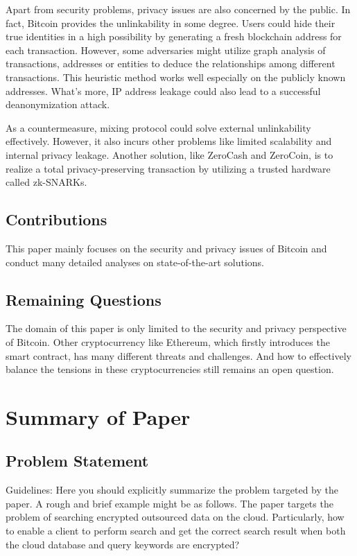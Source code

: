 \documentclass[conference]{IEEEtran}
\begin{document}
Apart from security problems, privacy issues are also concerned by the public.
%
In fact, Bitcoin provides the unlinkability in some degree.
%
Users could hide their true identities in a high possibility by generating a fresh blockchain address for each transaction.
%
However, some adversaries might utilize graph analysis of transactions, addresses or entities to deduce the relationships among different transactions.
%
This heuristic method works well especially on the publicly known addresses.
%
What's more, IP address leakage could also lead to a successful deanonymization attack.

As a countermeasure, mixing protocol could solve external unlinkability effectively.
%
However, it also incurs other problems like limited scalability and internal privacy leakage.
%
Another solution, like ZeroCash and ZeroCoin, is to realize a total privacy-preserving transaction by utilizing a trusted hardware called zk-SNARKs. 

\subsection{Contributions}
This paper mainly focuses on the security and privacy issues of Bitcoin and conduct many detailed analyses on state-of-the-art solutions.

\subsection{Remaining Questions}
The domain of this paper is only limited to the security and privacy perspective of Bitcoin.
%
Other cryptocurrency like Ethereum, which firstly introduces the smart contract, has many different threats and challenges.
%
And how to effectively balance the tensions in these cryptocurrencies still remains an open question.


\section{Summary of Paper \cite{CurtmolaGKO06}}

\subsection{Problem Statement}
Guidelines: Here you should explicitly summarize the problem targeted by the paper. A rough and brief example might be as follows.
%
The paper targets the problem of searching encrypted outsourced data on the cloud.
%
Particularly, how to enable a client to perform search and get the correct search result when both the cloud database and query keywords are encrypted?
\end{document}
